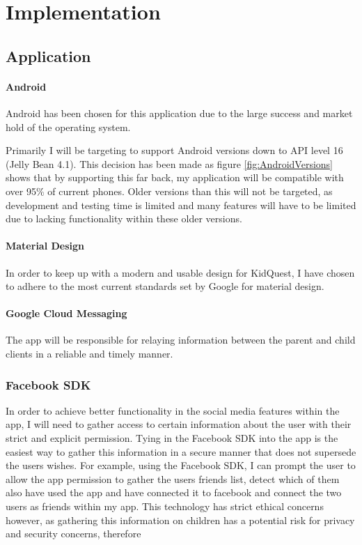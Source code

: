 


\chapter{Implementation}

\section{Application}
\subsubsection{Android}
Android has been chosen for this application due to the large success and market hold of the operating system.

Primarily I will be targeting to support Android versions down to API level 16 (Jelly Bean 4.1).
This decision has been made as figure \ref{fig:AndroidVersions} shows that by supporting this far back, my application will be compatible with over 95\% of current phones. 
Older versions than this will not be targeted, as development and testing time is limited and many features will have to be limited due to lacking functionality within these older versions.

\subsubsection{Material Design}
In order to keep up with a modern and usable design for KidQuest, I have chosen to adhere to the most current standards set by Google for material design.

\subsubsection{Google Cloud Messaging}
The app will be responsible for relaying information between the parent and child clients in a reliable and timely manner.

\subsection{Facebook SDK}
In order to achieve better functionality in the social media features within the app, I will need to gather access to certain information about the user with their strict and explicit permission. 
Tying in the Facebook SDK into the app is the easiest way to gather this information in a secure manner that does not supersede the users wishes.
For example, using the Facebook SDK, I can prompt the user to allow the app permission to gather the users friends list, detect which of them also have used the app and have connected it to facebook and connect the two users as friends within my app.
This technology has strict ethical concerns however, as gathering this information on children has a potential risk for privacy and security concerns, therefore


